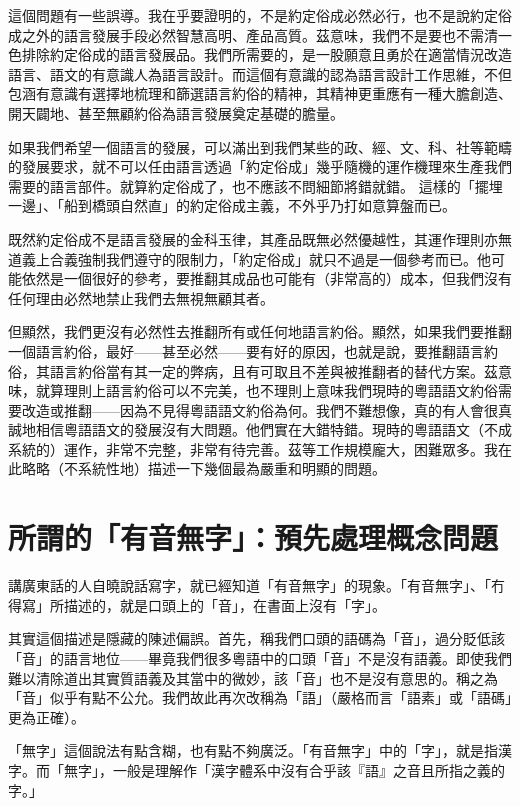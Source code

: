 \documentclass[a5paper, 10pt, openany]{book} %
\begin{document}
這個問題有一些誤導。我在乎要證明的，不是約定俗成必然必行，也不是說約定俗成之外的語言發展手段必然智慧高明、產品高質。茲意味，我們不是要也不需清一色排除約定俗成的語言發展品。我們所需要的，是一股願意且勇於在適當情況改造語言、語文的有意識人為語言設計。而這個有意識的認為語言設計工作思維，不但包涵有意識有選擇地梳理和篩選語言約俗的精神，其精神更重應有一種大膽創造、開天闢地、甚至無顧約俗為語言發展奠定基礎的膽量。

如果我們希望一個語言的發展，可以滿出到我們某些的政、經、文、科、社等範疇的發展要求，就不可以任由語言透過「約定俗成」幾乎隨機的運作機理來生產我們需要的語言部件。就算約定俗成了，也不應該不問細節將錯就錯。 這樣的「擺埋一邊」、「船到橋頭自然直」的約定俗成主義，不外乎乃打如意算盤而已。

既然約定俗成不是語言發展的金科玉律，其產品既無必然優越性，其運作理則亦無道義上合義強制我們遵守的限制力，「約定俗成」就只不過是一個參考而已。他可能依然是一個很好的參考，要推翻其成品也可能有（非常高的）成本，但我們沒有任何理由必然地禁止我們去無視無顧其者。

但顯然，我們更沒有必然性去推翻所有或任何地語言約俗。顯然，如果我們要推翻一個語言約俗，最好——甚至必然——要有好的原因，也就是說，要推翻語言約俗，其語言約俗當有其一定的弊病，且有可取且不差與被推翻者的替代方案。茲意味，就算理則上語言約俗可以不完美，也不理則上意味我們現時的粵語語文約俗需要改造或推翻——因為不見得粵語語文約俗為何。我們不難想像，真的有人會很真誠地相信粵語語文的發展沒有大問題。他們實在大錯特錯。現時的粵語語文（不成系統的）運作，非常不完整，非常有待完善。茲等工作規模龐大，困難眾多。我在此略略（不系統性地）描述一下幾個最為嚴重和明顯的問題。

\section{所謂的「有音無字」：預先處理概念問題}

講廣東話的人自曉說話寫字，就已經知道「有音無字」的現象。「有音無字」、「冇得寫」所描述的，就是口頭上的「音」，在書面上沒有「字」。

其實這個描述是隱藏的陳述偏誤。首先，稱我們口頭的語碼為「音」，過分貶低該「音」的語言地位——畢竟我們很多粵語中的口頭「音」不是沒有語義。即使我們難以清除道出其實質語義及其當中的微妙，該「音」也不是沒有意思的。稱之為「音」似乎有點不公允。我們故此再次改稱為「語」（嚴格而言「語素」或「語碼」更為正確）。

「無字」這個說法有點含糊，也有點不夠廣泛。「有音無字」中的「字」，就是指漢字。而「無字」，一般是理解作「漢字體系中沒有合乎該『語』之音且所指之義的字。」
\end{document}
